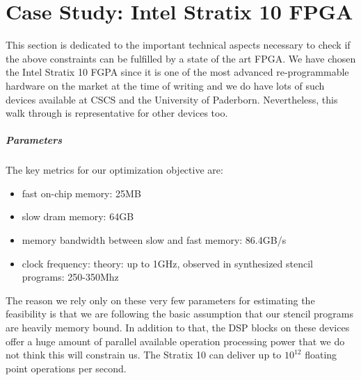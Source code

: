 \begin{center}
\end{center}


\section{Case Study: Intel Stratix 10 FPGA}
This section is dedicated to the important technical aspects necessary to check if the above constraints can be fulfilled by a state of the art FPGA. We have chosen the Intel Stratix 10 FGPA since it is one of the most advanced re-programmable hardware on the market at the time of writing and we do have lots of such devices available at CSCS and the University of Paderborn. Nevertheless, this walk through is representative for other devices too. \\


\subparagraph{Parameters}
The key metrics for our optimization objective are:
\begin{itemize}
	\item fast on-chip memory: 25MB
	\item slow dram memory: 64GB
	\item memory bandwidth between slow and fast memory: 86.4GB/s
	\item clock frequency: theory: up to 1GHz, observed in synthesized stencil programs: 250-350Mhz
\end{itemize}
The reason we rely only on these very few parameters for estimating the feasibility is that we are following the basic assumption that our stencil programs are heavily memory bound. In addition to that, the DSP blocks on these devices offer a huge amount of parallel available operation processing power that we do not think this will constrain us. The Stratix 10 can deliver up to $10^12$ floating point operations per second.


